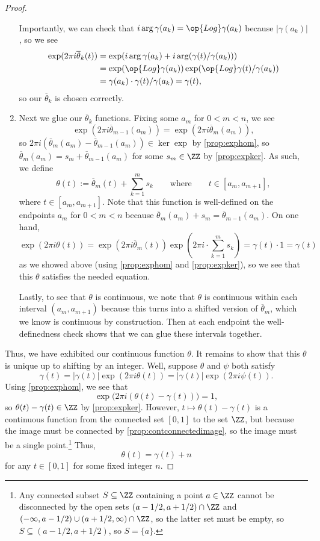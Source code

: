 \begin{proof}
\begin{enumerate}
		Importantly, we can check that $i\arg\gamma(a_k)=\op{Log}\gamma(a_k)$ because $|\gamma(a_k)|$, so we see
		\begin{align*}
			\exp(2\pi i\overline\theta_k(t)) &= \exp(i\arg\gamma(a_k)+i\arg(\gamma(t)/\gamma(a_k))) \\
			&= \exp(\op{Log}\gamma(a_k))\exp(\op{Log}\gamma(t)/\gamma(a_k)) \\
			&= \gamma(a_k)\cdot\gamma(t)/\gamma(a_k)=\gamma(t),
		\end{align*}
		so our $\overline\theta_k$ is chosen correctly.
		\item Next we glue our $\overline\theta_k$ functions. Fixing some $a_m$ for $0<m<n$, we see
		\[\exp(2\pi i\overline\theta_{m-1}(a_m))=\exp(2\pi i\overline\theta_m(a_m)),\]
		so $2\pi i(\overline\theta_m(a_m)-\overline\theta_{m-1}(a_m))\in\ker\exp$ by \autoref{prop:exphom}, so $\overline\theta_m(a_m)=s_m+\overline\theta_{m-1}(a_m)$ for some $s_m\in\ZZ$ by \autoref{prop:expker}. As such, we define
		\[\theta(t):=\overline\theta_m(t)+\sum_{k=1}^ms_k\qquad\text{where}\qquad t\in[a_m,a_{m+1}],\]
		where $t\in[a_m,a_{m+1}]$. Note that this function is well-defined on the endpoints $a_m$ for $0<m<n$ because $\overline\theta_m(a_m)+s_m=\overline\theta_{m-1}(a_m)$. On one hand,
		\[\exp(2\pi i\theta(t))=\exp(2\pi i\overline\theta_m(t))\exp\left(2\pi i\cdot\sum_{k=1}^ms_k\right)=\gamma(t)\cdot1=\gamma(t)\]
		as we showed above (using \autoref{prop:exphom} and \autoref{prop:expker}), so we see that this $\theta$ satisfies the needed equation.

		Lastly, to see that $\theta$ is continuous, we note that $\theta$ is continuous within each interval $(a_m,a_{m+1})$ because this turns into a shifted version of $\overline\theta_m$, which we know is continuous by construction. Then at each endpoint the well-definedness check shows that we can glue these intervals together.
	\end{enumerate}
	Thus, we have exhibited our continuous function $\theta$. It remains to show that this $\theta$ is unique up to shifting by an integer. Well, suppose $\theta$ and $\psi$ both satisfy
	\[\gamma(t)=|\gamma(t)|\exp(2\pi i\theta(t))=|\gamma(t)|\exp(2\pi i\psi(t)).\]
	Using \autoref{prop:exphom}, we see that
	\[\exp\big(2\pi i(\theta(t)-\gamma(t))\big)=1,\]
	so $\theta(t)-\gamma(t)\in\ZZ$ by \autoref{prop:expker}. However, $t\mapsto\theta(t)-\gamma(t)$ is a continuous function from the connected set $[0,1]$ to the set $\ZZ$, but because the image must be connected by \autoref{prop:contconnectedimage}, so the image must be a single point.\footnote{Any connected subset $S\subseteq\ZZ$ containing a point $a\in\ZZ$ cannot be disconnected by the open sets $(a-1/2,a+1/2)\cap\ZZ$ and $(-\infty,a-1/2)\cup(a+1/2,\infty)\cap\ZZ$, so the latter set must be empty, so $S\subseteq(a-1/2,a+1/2)$, so $S=\{a\}$.} Thus,
	\[\theta(t)=\gamma(t)+n\]
	for any $t\in[0,1]$ for some fixed integer $n$.
\end{proof}
